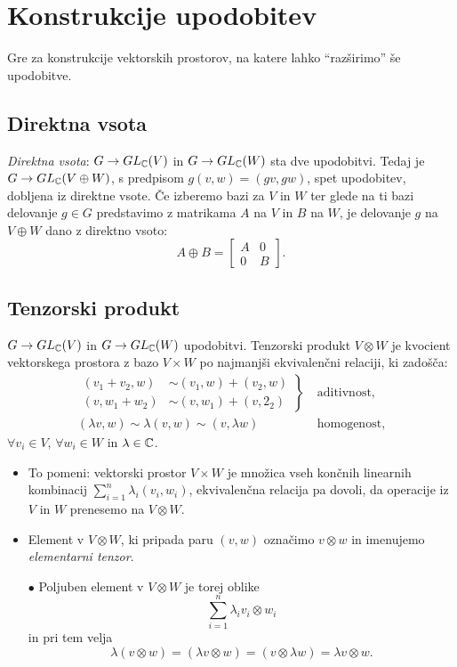 \section{Konstrukcije upodobitev}

Gre za konstrukcije vektorskih prostorov, na katere lahko "`raz\v sirimo"' \v se upodobitve.
\subsection{Direktna vsota}
\emph{Direktna vsota}: $G \to GL_{\mathbb{C}}(V)$ in $G \to GL_{\mathbb{C}}(W)$ sta dve upodobitvi. Tedaj je
$G \to GL_{\mathbb{C}}(V \oplus W)$, s predpisom $g (v, w) = (gv, gw)$,  spet upodobitev, dobljena iz
direktne vsote. \v Ce izberemo bazi za $V$ in $W$ ter glede na ti bazi delovanje $g \in G$ predstavimo
z matrikama $A$ na $V$ in $B$ na $W$, je delovanje $g$ na $V \oplus W$ dano z direktno vsoto:
\[
	A \oplus B = \begin{bmatrix}
		A & 0 \\
		0 & B
	\end{bmatrix}.
\]

\subsection{Tenzorski produkt}
$G \to GL_{\mathbb{C}} (V)$ in $G \to GL_{\mathbb{C}} (W)$ upodobitvi. Tenzorski produkt $V \otimes W$ je
kvocient vektorskega prostora z bazo $V \times W$ po najmanj\v si ekvivalen\v cni relaciji, ki zado\v s\v ca:
\begin{align*}
	\left.
	\begin{array}{rl}
	(v_1 + v_2, w) &\sim (v_1, w) + (v_2, w) \\
	(v, w_1 + w_2) &\sim (v, w_1) + (v, 2_2)
	\end{array}\right\}\ &\text{aditivnost}, \\
	(\lambda v, w) \sim \lambda (v,w) \sim (v, \lambda w)\ &\text{homogenost},
\end{align*}
$\forall v_i \in V$, $\forall w_i \in W$ in $\lambda \in \mathbb{C}$.
\begin{itemize}
	\item{To pomeni: vektorski prostor $V \times W$ je mno\v zica vseh kon\v cnih linearnih kombinacij
		$\sum_{i = 1}^n \lambda_i(v_i, w_i)$, ekvivalen\v cna relacija pa dovoli, da operacije iz $V$ in $W$
		prenesemo na $V \otimes W$.}
	\item{Element v $V \otimes W$, ki pripada paru $(v, w)$ ozna\v cimo $v \otimes w$ in imenujemo
		\emph{elementarni tenzor}.}
	\item[$\bullet$]{Poljuben element v $V \otimes W$ je torej oblike
		\[
			\sum_{i = 1}^n \lambda_i v_i \otimes w_i
		\]
		in pri tem velja
		\[
			\lambda(v \otimes w) = (\lambda v \otimes w) = (v \otimes \lambda w) = \lambda v \otimes w.
		\]}
\end{itemize}

